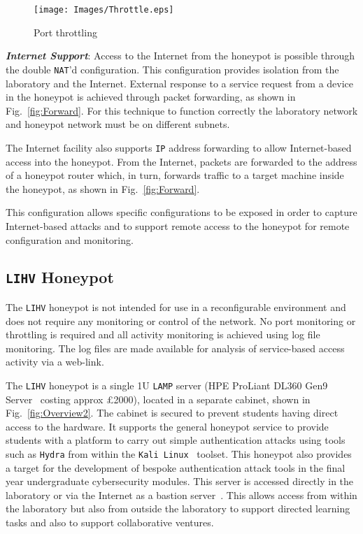 \documentclass[10pt,journal]{IEEEtran}
\begin{document}
\begin{figure}[ht]
\begin{center}
	\texttt{[image: Images/Throttle.eps]}
\caption{Port throttling\label{fig:throttling}}
\end{center}
\end{figure}

\noindent\textit{\textbf{Internet Support}}:
Access to the Internet from the honeypot is possible through the double
\texttt{NAT}'d configuration. This configuration provides isolation from the
laboratory and the Internet. External response to a service request from a
device in the honeypot is achieved through packet forwarding, as shown in
Fig.~\ref{fig:Forward}. For this technique to function correctly the laboratory
network and honeypot network must be on different subnets.

The Internet facility also supports \texttt{IP} address forwarding to allow
Internet-based access into the honeypot. From the Internet, packets are
forwarded to the address of a honeypot router which, in turn, forwards traffic
to a target machine inside the honeypot, as shown in Fig.~\ref{fig:Forward}.

This configuration allows specific configurations to be exposed in order to
capture Internet-based attacks and to support remote access to the honeypot for
remote configuration and monitoring.

\subsection{\texttt{LIHV} Honeypot}

The \texttt{LIHV} honeypot is not intended for use in a reconfigurable
environment and does not require any monitoring or control of the network. No
port monitoring or throttling is required and all activity monitoring is
achieved using log file monitoring. The log files are made available 
for analysis of service-based access activity via a web-link.

The \texttt{LIHV} honeypot is a single 1U \texttt{LAMP} server (HPE ProLiant DL360 Gen9 Server~\cite{HPE:17} costing approx \pounds2000), located in a
separate cabinet, shown in Fig.~\ref{fig:Overview2}. The cabinet is secured to
prevent students having direct access to the hardware. It supports the general
honeypot service to provide students with a platform to carry out simple
authentication attacks using tools such as \texttt{Hydra} from within the
\texttt{Kali Linux}~\cite{OS:17} toolset. This honeypot also provides a target
for the development of bespoke authentication attack tools in the final year
undergraduate cybersecurity modules.  This server is accessed directly in the
laboratory or via the Internet as a bastion server~\cite{MB:05}. This allows
access from within the laboratory but also from outside the laboratory to
support directed learning tasks and also to support collaborative ventures.
\end{document}
